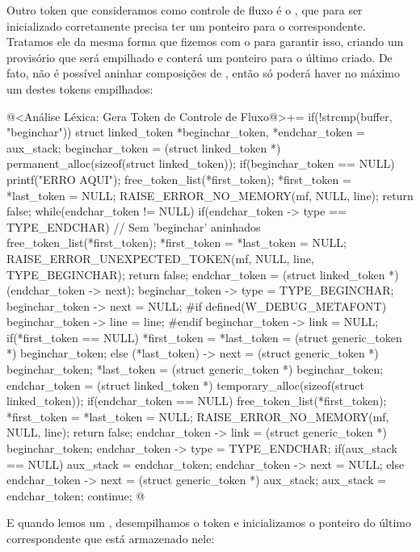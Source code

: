 Outro token que consideramos como controle de fluxo é
o , que para ser inicializado corretamente
precisa ter um ponteiro para o 
correspondente. Tratamos ele da mesma forma que fizemos com
o  para garantir isso, criando um 
provisório que será empilhado e conterá um ponteiro para o
último  criado. De fato, não é possível aninhar
composições de , então só poderá haver no máximo
um destes tokens empilhados:

\iniciocodigo
@<Análise Léxica: Gera Token de Controle de Fluxo@>+=
if(!strcmp(buffer, "beginchar")){
  struct linked_token *beginchar_token, *endchar_token = aux_stack;
  beginchar_token = (struct linked_token *)
                      permanent_alloc(sizeof(struct linked_token));
  if(beginchar_token ==  NULL){
    printf("ERRO AQUI\n");
    free_token_list(*first_token);
    *first_token = *last_token = NULL;
    RAISE_ERROR_NO_MEMORY(mf, NULL, line);
    return false;
  }
  while(endchar_token != NULL){
    if(endchar_token -> type == TYPE_ENDCHAR){ // Sem 'beginchar' aninhados
      free_token_list(*first_token);
      *first_token = *last_token = NULL;
      RAISE_ERROR_UNEXPECTED_TOKEN(mf, NULL, line, TYPE_BEGINCHAR);
      return false;
    }
    endchar_token = (struct linked_token *) (endchar_token -> next);
  }
  beginchar_token -> type = TYPE_BEGINCHAR;
  beginchar_token -> next = NULL;
#if defined(W_DEBUG_METAFONT)
  beginchar_token -> line = line;
#endif
  beginchar_token -> link = NULL;
  if(*first_token == NULL)
    *first_token = *last_token = (struct generic_token *) beginchar_token;
  else{
    (*last_token) -> next = (struct generic_token *) beginchar_token;
    *last_token = (struct generic_token *) beginchar_token;
  }
  endchar_token = (struct linked_token *)
                    temporary_alloc(sizeof(struct linked_token));
  if(endchar_token == NULL){
    free_token_list(*first_token);
    *first_token = *last_token = NULL;
    RAISE_ERROR_NO_MEMORY(mf, NULL, line);
    return false;
  }
  endchar_token -> link = (struct generic_token *) beginchar_token;
  endchar_token -> type = TYPE_ENDCHAR;
  if(aux_stack == NULL){
    aux_stack = endchar_token;
    endchar_token -> next = NULL;
  }
  else{
    endchar_token -> next = (struct generic_token *) aux_stack;
    aux_stack = endchar_token;
  }
  continue;
}
@
\fimcodigo

E quando lemos um , desempilhamos o token e
inicializamos o ponteiro do último 
correspondente que está armazenado nele:

